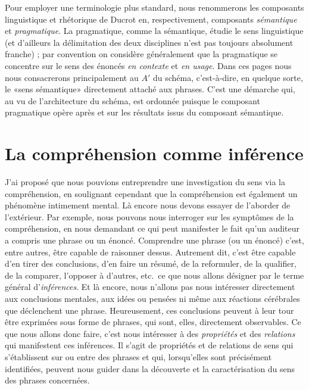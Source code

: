 \begin{refsegment}
Pour employer une terminologie plus standard, nous renommerons les composants linguistique et rhétorique de Ducrot en, respectivement, composants \emph{sémantique} et \emph{pragmatique}.  La pragmatique, comme la sémantique, étudie le sens linguistique (et d'ailleurs la délimitation des deux disciplines n'est pas toujours absolument franche) ; par convention on considère généralement que la pragmatique se concentre sur le sens des énoncés \emph{en contexte} et \emph{en usage}.
Dans ces pages nous nous consacrerons principalement au $A'$ du schéma, c'est-à-dire, en quelque sorte, le «sens sémantique» directement attaché aux phrases.  C'est une démarche qui, au vu de l'architecture du schéma, est ordonnée puisque le composant pragmatique opère après et sur les résultats issus du composant sémantique.






\section{La compréhension comme inférence}
\label{s:RelInfer}



J'ai proposé que nous pouvions entreprendre une investigation du sens
via la compréhension, en soulignant cependant que  la compréhension est également un
phénomène intimement mental. Là encore nous devons essayer de
l'aborder de l'extérieur. %
Par exemple, nous pouvons nous interroger sur les symptômes de la
compréhension, en nous demandant ce qui peut manifester le fait qu'un
auditeur a compris une phrase ou un énoncé.  Comprendre une phrase (ou
un énoncé) c'est, entre autres, être capable de raisonner dessus.
Autrement dit, c'est être capable d'en tirer des conclusions, d'en
faire un résumé, de la reformuler, de la qualifier, de la comparer, l'opposer à
d'autres, etc.\ ce que nous allons désigner par le terme général d'\emph{inférences}.
Et là encore, nous n'allons pas nous intéresser
directement aux conclusions mentales, aux idées ou pensées ni
même aux réactions cérébrales que déclenchent une phrase.
Heureusement, ces conclusions peuvent à leur tour être exprimées sous
forme de phrases, qui sont, elles, directement observables.  Ce que nous
allons donc faire, c'est nous intéresser à des \emph{propriétés} et des \emph{relations} qui manifestent ces inférences.  Il s'agit de propriétés et de relations de sens qui s'établissent sur ou entre des phrases et qui, lorsqu'elles sont précisément identifiées, peuvent nous guider dans la découverte et la caractérisation du sens des phrases concernées.






\end{refsegment}

